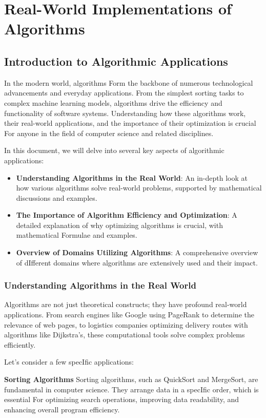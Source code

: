 \documentclass[12pt]{book} %
\begin{document}
\chapter{Real-World Implementations of Algorithms}
\section{Introduction to Algorithmic Applications}
In the modern world, algorithms Form the backbone of numerous technological advancements and everyday applications. From the simplest sorting tasks to complex machine learning models, algorithms drive the efficiency and functionality of software systems. Understanding how these algorithms work, their real-world applications, and the importance of their optimization is crucial For anyone in the field of computer science and related disciplines.

In this document, we will delve into several key aspects of algorithmic applications:
\begin{itemize}
    \item \textbf{Understanding Algorithms in the Real World}: An in-depth look at how various algorithms solve real-world problems, supported by mathematical discussions and examples.
    \item \textbf{The Importance of Algorithm Efficiency and Optimization}: A detailed explanation of why optimizing algorithms is crucial, with mathematical Formulae and examples.
    \item \textbf{Overview of Domains Utilizing Algorithms}: A comprehensive overview of dIfferent domains where algorithms are extensively used and their impact.
\end{itemize}

\subsection{Understanding Algorithms in the Real World}
Algorithms are not just theoretical constructs; they have profound real-world applications. From search engines like Google using PageRank to determine the relevance of web pages, to logistics companies optimizing delivery routes with algorithms like Dijkstra’s, these computational tools solve complex problems efficiently.

Let’s consider a few specIfic applications:

\textbf{Sorting Algorithms}
Sorting algorithms, such as QuickSort and MergeSort, are fundamental in computer science. They arrange data in a specIfic order, which is essential For optimizing search operations, improving data readability, and enhancing overall program efficiency.
\end{document}
